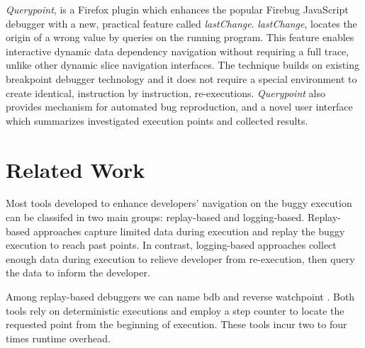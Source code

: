 \documentclass{sig-alternate}
\begin{document}
\textit{Querypoint}, is a Firefox plugin which enhances the popular 
Firebug JavaScript debugger with a new, practical feature called 
\textit{lastChange}\cite{Mirghasemi2011}. \textit{lastChange}, locates the origin of a wrong
value by queries on the running program. This feature enables interactive 
dynamic data dependency navigation without requiring a full trace, unlike 
other dynamic slice navigation interfaces. The technique builds on existing 
breakpoint debugger technology  and it does not require a special environment to
create identical, instruction by instruction, re-executions. \textit{Querypoint} 
also provides mechanism for automated bug reproduction, and a novel user interface which
summarizes investigated execution points and collected results.






\section{Related Work}
\label{sec:relatedWork}
Most tools developed to enhance developers' navigation on the buggy execution can 
be classifed in two main groups: replay-based and logging-based. Replay-based 
approaches capture limited data during execution and replay the buggy execution 
to reach past points. In contrast, logging-based approaches collect enough data during
execution to relieve developer from re-execution, then query the data to 
inform the developer.

Among replay-based debuggers we can name bdb \cite{Boothe} and
reverse watchpoint \cite{Maruyama}. Both tools rely on deterministic
executions and employ a step counter to locate the requested point from the
beginning of execution. These tools incur two to four times runtime overhead.
\end{document}
